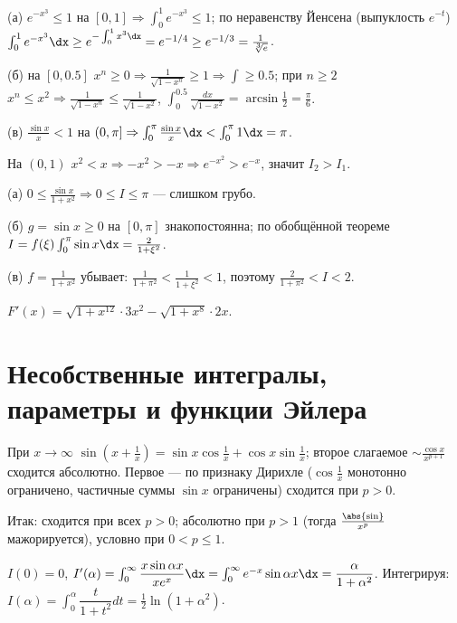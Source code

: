 \sol (а) $e^{-x^3}\le1$ на $[0,1]\Rightarrow\int_0^1 e^{-x^3}\le1$; по неравенству Йенсена (выпуклость
$e^{-t}$) $\int_0^1 e^{-x^3}\dx\ge e^{-\int_0^1 x^3\dx}=e^{-1/4}\ge e^{-1/3}=\tfrac1{\sqrt[3]e}$.

(б) на $[0,0.5]$ $x^n\ge0\Rightarrow\tfrac1{\sqrt{1-x^n}}\ge1\Rightarrow\int\ge0.5$; при $n\ge2$
$x^n\le x^2\Rightarrow\tfrac1{\sqrt{1-x^n}}\le\tfrac1{\sqrt{1-x^2}}$, $\int_0^{0.5}\tfrac{dx}{\sqrt{1-x^2}}=\arcsin\tfrac12=\tfrac\pi6$.

(в) $\tfrac{\sin x}{x}<1$ на $(0,\pi]\Rightarrow\int_0^\pi\tfrac{\sin x}x\dx<\int_0^\pi1\dx=\pi$.

\sol На $(0,1)$ $x^2<x\Rightarrow-x^2>-x\Rightarrow e^{-x^2}>e^{-x}$, значит $I_2>I_1$.

\sol (а) $0\le\tfrac{\sin x}{1+x^2}\Rightarrow 0\le I\le\pi$ — слишком грубо.

(б) $g=\sin x\ge0$ на
$[0,\pi]$ знакопостоянна; по обобщённой теореме $I=f(\xi)\int_0^\pi\sin x\dx=\tfrac{2}{1+\xi^2}$.

(в) $f=\tfrac1{1+x^2}$ убывает: $\tfrac1{1+\pi^2}<\tfrac1{1+\xi^2}<1$, поэтому
$\tfrac{2}{1+\pi^2}<I<2$.

\sol $F'(x)=\sqrt{1+x^{12}}\cdot3x^2-\sqrt{1+x^8}\cdot2x$.

\section{Несобственные интегралы, параметры и функции Эйлера}

\sol При $x\to\infty$ $\sin(x+\tfrac1x)=\sin x\cos\tfrac1x+\cos x\sin\tfrac1x$; второе слагаемое
$\sim\tfrac{\cos x}{x^{p+1}}$ сходится абсолютно. Первое — по признаку Дирихле ($\cos\tfrac1x$
монотонно ограничено, частичные суммы $\sin x$ ограничены) сходится при $p>0$.

Итак: сходится при
всех $p>0$; абсолютно при $p>1$ (тогда $\tfrac{\abs{\sin}}{x^p}$ мажорируется), условно при
$0<p\le1$.

\sol $I(0)=0$, $I'(\alpha)=\int_0^\infty\dfrac{x\sin\alpha x}{x e^x}\dx=\int_0^\infty e^{-x}\sin\alpha x\dx
=\dfrac{\alpha}{1+\alpha^2}$. Интегрируя: $I(\alpha)=\int_0^\alpha\dfrac{t}{1+t^2}dt
=\tfrac12\ln(1+\alpha^2)$.

